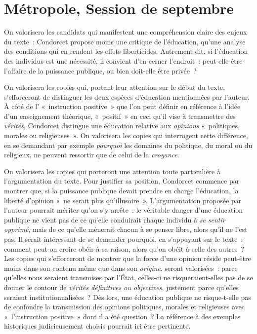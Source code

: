 \section{Métropole, Session de septembre}

		{On valorisera les candidats qui manifestent une compréhension claire des
enjeux du texte~: Condorcet propose moins une critique de l'éducation, qu'une analyse
des conditions qui en rendent les effets liberticides. Autrement dit, si l'éducation des
individus est une nécessité, il convient d'en cerner l'endroit~: peut-elle être l'affaire de
la puissance publique, ou bien doit-elle être privée~?

On valorisera les copies qui, portant leur attention sur le début du texte, s'efforceront de distinguer les deux espèces d'éducation mentionnées par l'auteur. À côté de l' «~instruction positive~» que l'on peut définir en référence à l'idée d'un enseignement théorique, «~positif~» en ceci qu'il vise à transmettre des \emph{vérités}, Condorcet distingue une éducation relative aux \emph{opinions} «~politiques, morales ou religieuses~». On valorisera les copies qui interrogent cette différence, en se demandant par exemple \emph{pourquoi} les domaines du politique, du moral ou du religieux, ne peuvent ressortir que de celui de la \emph{croyance}.

On valorisera les copies qui porteront une attention toute particulière à l'argumentation du texte. Pour justifier sa position, Condorcet commence par montrer que, si la puissance publique devait prendre en charge l'éducation, la liberté d'opinion «~ne serait plus qu'illusoire~». L'argumentation proposée par l'auteur pourrait mériter qu'on s'y arrête~: le véritable danger d'une éducation publique ne vient pas de ce qu'elle conduirait chaque individu à \emph{se sentir opprimé}, mais de ce qu'elle mènerait chacun à se penser libre, alors qu'il ne l'est pas. Il serait intéressant de se demander pourquoi, en s'appuyant sur le texte~: comment peut-on croire obéir à sa raison, alors qu'on obéit à celle des autres~? Les copies qui s'efforceront de montrer que la force d'une opinion réside peut-être moins dans son contenu même que dans son \emph{origine}, seront valorisées~: parce qu'elles nous seraient transmises par l'État, celles-ci ne risqueraient-elles pas de se donner le contour de \emph{vérités définitives ou objectives}, justement parce qu'elles seraient institutionnalisées~? Dès lors, une éducation publique ne risque-t-elle pas de confondre la transmission des opinions politiques, morales et religieuses avec «~l'instruction positive~» dont il a été question~? La référence à des exemples historiques judicieusement choisis pourrait ici être pertinente.

}
